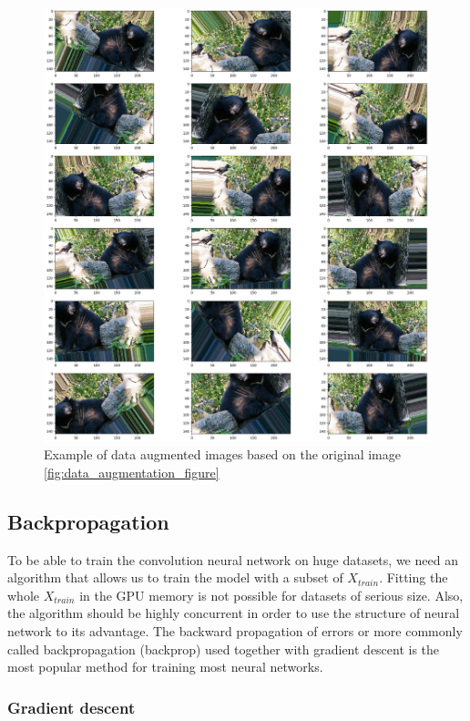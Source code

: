 \documentclass[times, utf8, diplomski]{fer}
\begin{document}
\begin{figure}
  \includegraphics[scale=0.35]{figures/da1.png}
  \centering
  \caption{Example of data augmented images based on the original image \ref{fig:data_augmentation_figure}}
  \label{fig:data_augmentation}
\end{figure}

\subsection{Backpropagation} \label{se:backprop}

To be able to train the convolution neural network on huge datasets, we need an algorithm that allows us to train the model with a subset of $X_{train}$. Fitting the whole $X_{train}$ in the GPU memory is not possible for datasets of serious size. Also, the algorithm should be highly concurrent in order to use the structure of neural network to its advantage. The backward propagation of errors or more commonly called backpropagation (backprop) used together with gradient descent is the most popular method for training most neural networks.

\subsubsection{Gradient descent}
\end{document}
